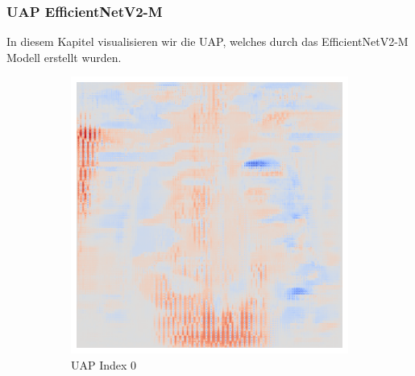 \subsubsection{UAP EfficientNetV2-M}
In diesem Kapitel visualisieren wir die UAP, welches durch das EfficientNetV2-M Modell erstellt wurden.


\begin{figure}[ht!]
    \centering
    \begin{subfigure}{0.19\linewidth}
        \centering
        \includegraphics[height=1\linewidth]{01-images/05-resultate/uap_efficientnet/uap0-efficientnetv2m-covid-n200-robustificationslevel0.png}
        \caption{UAP Index 0}
    \end{subfigure}\hfill%
    \begin{subfigure}{0.19\linewidth}
        \centering

\end{subfigure}
\end{figure}
